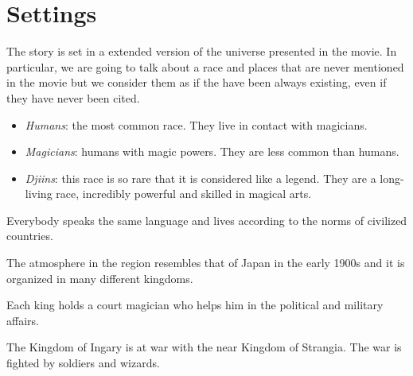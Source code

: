 \section{Settings}
The story is set in a extended version of the universe presented in the movie. In particular, we are going to talk about a race and places that are never mentioned in the movie but we consider them as if the have been always existing, even if they have never been cited.


\begin{itemize}
	\item \textit{Humans}: the most common race. They live in contact with magicians.

	\item \textit{Magicians}: humans with magic powers. They are less common than humans.

	\item \textit{Djiins}: this race is so rare that it is considered like a legend. They are a long-living race, incredibly powerful and skilled in magical arts.
\end{itemize}

Everybody speaks the same language and lives according to the norms of civilized countries.

The atmosphere in the region resembles that of Japan in the early 1900s and it is organized in many different kingdoms.

Each king holds a court magician who helps him in the political and military affairs.


The Kingdom of Ingary is at war with the near Kingdom of Strangia. The war is fighted by soldiers and wizards.


